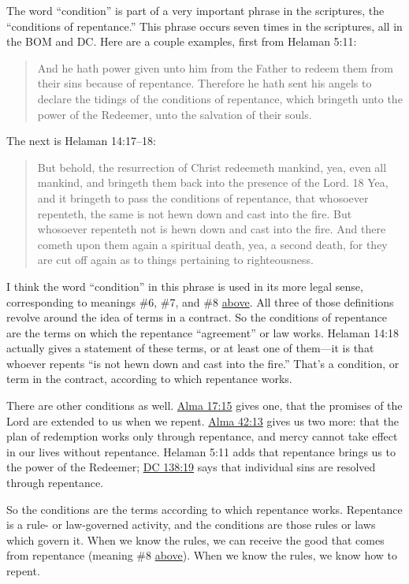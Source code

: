 		The word ``condition'' is part of a very important phrase in the scriptures, the ``conditions of repentance.'' This phrase occurs seven times in the scriptures, all in the BOM and DC. Here are a couple examples, first from Helaman 5:11:
		
			\begin{quote}
				And he hath power given unto him from the Father to redeem them from their sins because of repentance. Therefore he hath sent his angels to declare the tidings of the conditions of repentance, which bringeth unto the power of the Redeemer, unto the salvation of their souls.
			\end{quote}
			
		The next is Helaman 14:17--18:
		
			\begin{quote}
				But behold, the resurrection of Christ redeemeth mankind, yea, even all mankind, and bringeth them back into the presence of the Lord. 18 Yea, and it bringeth to pass the conditions of repentance, that whosoever repenteth, the same is not hewn down and cast into the fire. But whosoever repenteth not is hewn down and cast into the fire. And there cometh upon them again a spiritual death, yea, a second death, for they are cut off again as to things pertaining to righteousness. 
			\end{quote}
			
		I think the word ``condition'' in this phrase is used in its more legal sense, corresponding to meanings \#6, \#7, and \#8 \hyperref[CONDITION-1828]{above}. All three of those definitions revolve around the idea of terms in a contract. So the conditions of repentance are the terms on which the repentance ``agreement'' or law works. Helaman 14:18 actually gives a statement of these terms, or at least one of them---it is that whoever repents ``is not hewn down and cast into the fire.'' That's a condition, or term in the contract, according to which repentance works.

		There are other conditions as well. \hyperref[ALMA-17-15]{Alma 17:15} gives one, that the promises of the Lord are extended to us when we repent. \hyperref[ALMA-42-13]{Alma 42:13} gives us two more: that the plan of redemption works only through repentance, and mercy cannot take effect in our lives without repentance. Helaman 5:11 adds that repentance brings us to the power of the Redeemer; \hyperref[DC138-19]{DC 138:19} says that individual sins are resolved through repentance.
		
		So the conditions are the terms according to which repentance works. Repentance is a rule- or law-governed activity, and the conditions are those rules or laws which govern it. When we know the rules, we can receive the good that comes from repentance (meaning \#8 \hyperref[CONDITION-1828]{above}). When we know the rules, we know how to repent.
		
